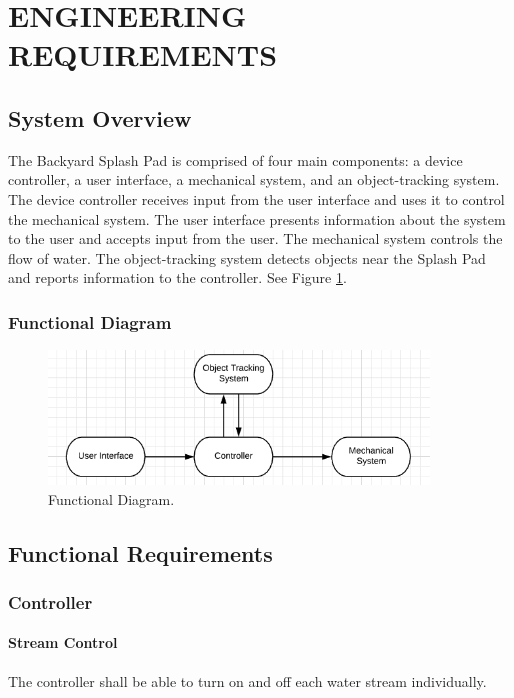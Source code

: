 \section{ENGINEERING REQUIREMENTS}

\subsection{System Overview} 
The Backyard Splash Pad is comprised of four main components: a device controller, a user interface, a mechanical system, and an object-tracking system. 
The device controller receives input from the user interface and uses it to control the mechanical system.
The user interface presents information about the system to the user and accepts input from the user.
The mechanical system controls the flow of water. 
The object-tracking system detects objects near the Splash Pad and reports information to the controller. 
See Figure \ref{fig:functional_diagram}.

\subsubsection{Functional Diagram}

\begin{figure}[h]
\centering
\includegraphics[width=0.9\textwidth]{Functional_Diagram.png}
\caption{\label{fig:functional_diagram}Functional Diagram.}
\end{figure}

\subsection{Functional Requirements}

\subsubsection{Controller}

\paragraph{Stream Control}
The controller shall be able to turn on and off each water stream individually.

